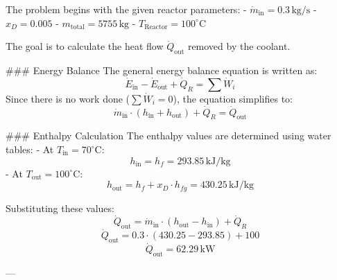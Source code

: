 The problem begins with the given reactor parameters:  
- \( \dot{m}_{\text{in}} = 0.3 \, \text{kg/s} \)  
- \( x_D = 0.005 \)  
- \( m_{\text{total}} = 5755 \, \text{kg} \)  
- \( T_{\text{Reactor}} = 100^\circ\text{C} \)  

The goal is to calculate the heat flow \( \dot{Q}_{\text{out}} \) removed by the coolant.  

### Energy Balance  
The general energy balance equation is written as:  
\[
\dot{E}_{\text{in}} - \dot{E}_{\text{out}} + \dot{Q}_R = \sum \dot{W}_i
\]  
Since there is no work done (\( \sum \dot{W}_i = 0 \)), the equation simplifies to:  
\[
\dot{m}_{\text{in}} \cdot (h_{\text{in}} + h_{\text{out}}) + \dot{Q}_R = \dot{Q}_{\text{out}}
\]  

### Enthalpy Calculation  
The enthalpy values are determined using water tables:  
- At \( T_{\text{in}} = 70^\circ\text{C} \):  
  \[
  h_{\text{in}} = h_f = 293.85 \, \text{kJ/kg}
  \]  
- At \( T_{\text{out}} = 100^\circ\text{C} \):  
  \[
  h_{\text{out}} = h_f + x_D \cdot h_{fg} = 430.25 \, \text{kJ/kg}
  \]  

Substituting these values:  
\[
\dot{Q}_{\text{out}} = \dot{m}_{\text{in}} \cdot (h_{\text{out}} - h_{\text{in}}) + \dot{Q}_R
\]  
\[
\dot{Q}_{\text{out}} = 0.3 \cdot (430.25 - 293.85) + 100
\]  
\[
\dot{Q}_{\text{out}} = 62.29 \, \text{kW}
\]  

---